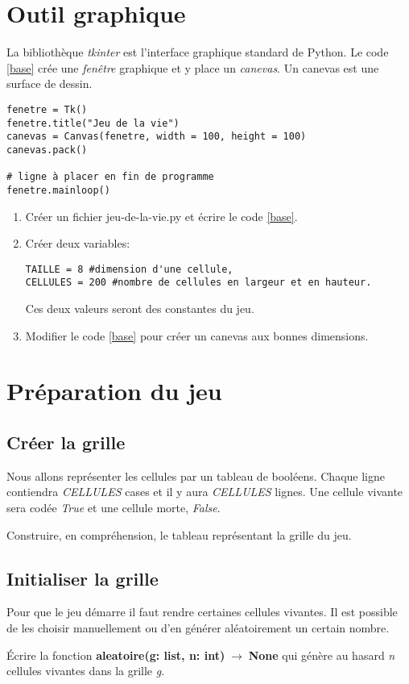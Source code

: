 \documentclass[a4paper,11pt]{article}
\begin{document}
\begin{Form}
\section{Outil graphique}
La bibliothèque \emph{tkinter} est l'interface graphique standard de Python. Le code \ref{base} crée une \emph{fenêtre} graphique et y place un \emph{canevas}. Un canevas est une surface de dessin.
\begin{code}[!h]
\begin{lstlisting}
fenetre = Tk()
fenetre.title("Jeu de la vie")
canevas = Canvas(fenetre, width = 100, height = 100)
canevas.pack()

# ligne à placer en fin de programme
fenetre.mainloop()
\end{lstlisting}
\label{base}
\end{code}
\begin{activite}
\begin{enumerate}
\item Créer un fichier jeu-de-la-vie.py et écrire le code \ref{base}.
\item Créer deux variables:
\begin{lstlisting}[xleftmargin=3em,xrightmargin=3em]
TAILLE = 8 #dimension d'une cellule,
CELLULES = 200 #nombre de cellules en largeur et en hauteur.
\end{lstlisting}
Ces deux valeurs seront des constantes du jeu.
\item Modifier le code \ref{base} pour créer un canevas aux bonnes dimensions.
\end{enumerate}
\end{activite}
\section{Préparation du jeu}
\subsection{Créer la grille}
Nous allons représenter les cellules par un tableau de booléens. Chaque ligne contiendra \emph{CELLULES} cases et il y aura \emph{CELLULES} lignes. Une cellule vivante sera codée \emph{True} et une cellule morte, \emph{False}.
\begin{activite}
Construire, en compréhension, le tableau représentant la grille du jeu.
\end{activite}
\subsection{Initialiser la grille}
Pour que le jeu démarre il faut rendre certaines cellules vivantes. Il est possible de les choisir manuellement ou d'en générer aléatoirement un certain nombre.
\begin{activite}
Écrire la fonction \textbf{aleatoire(g: list, n: int)$\;\rightarrow\;$None} qui génère au hasard \emph{n} cellules vivantes dans la grille \emph{g}.
\end{activite}

\end{Form}
\end{document}

